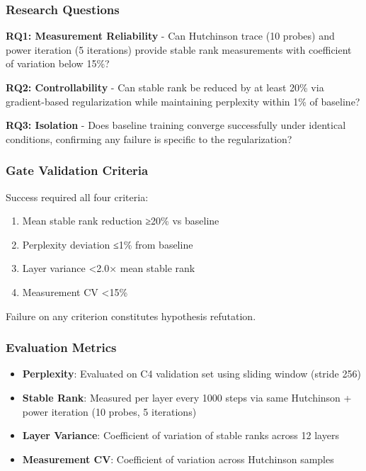 
\subsubsection{Research Questions}

\textbf{RQ1: Measurement Reliability} - Can Hutchinson trace (10 probes) and power iteration (5 iterations) provide stable rank measurements with coefficient of variation below 15\%?

\textbf{RQ2: Controllability} - Can stable rank be reduced by at least 20\% via gradient-based regularization while maintaining perplexity within 1\% of baseline?

\textbf{RQ3: Isolation} - Does baseline training converge successfully under identical conditions, confirming any failure is specific to the regularization?

\subsubsection{Gate Validation Criteria}

Success required all four criteria:
\begin{enumerate}
\item Mean stable rank reduction ≥20\% vs baseline
\item Perplexity deviation ≤1\% from baseline
\item Layer variance <2.0× mean stable rank
\item Measurement CV <15\%
\end{enumerate}

Failure on any criterion constitutes hypothesis refutation.

\subsubsection{Evaluation Metrics}

\begin{itemize}
\item \textbf{Perplexity}: Evaluated on C4 validation set using sliding window (stride 256)
\item \textbf{Stable Rank}: Measured per layer every 1000 steps via same Hutchinson + power iteration (10 probes, 5 iterations)
\item \textbf{Layer Variance}: Coefficient of variation of stable ranks across 12 layers
\item \textbf{Measurement CV}: Coefficient of variation across Hutchinson samples
\end{itemize}
